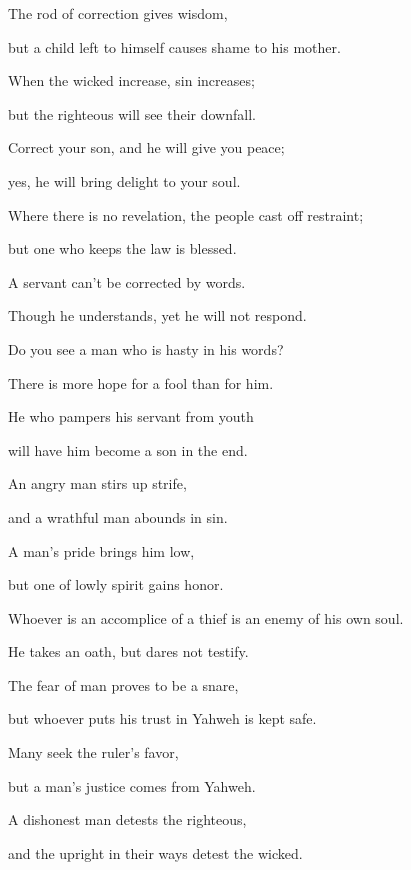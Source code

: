{\par }{\Q {}The rod of correction gives wisdom,
\par }{\QB but a child left to himself causes shame to his mother.
\par }{\Q {}When the wicked increase, sin increases;
\par }{\QB but the righteous will see their downfall.
\par }{\Q {}Correct your son, and he will give you peace;
\par }{\QB yes, he will bring delight to your soul.
\par }{\Q {}Where there is no revelation, the people cast off restraint;
\par }{\QB but one who keeps the law is blessed.
\par }{\Q {}A servant can’t be corrected by words.
\par }{\QB Though he understands, yet he will not respond.
\par }{\Q {}Do you see a man who is hasty in his words?
\par }{\QB There is more hope for a fool than for him.
\par }{\Q {}He who pampers his servant from youth
\par }{\QB will have him become a son in the end.
\par }{\Q {}An angry man stirs up strife,
\par }{\QB and a wrathful man abounds in sin.
\par }{\Q {}A man’s pride brings him low,
\par }{\QB but one of lowly spirit gains honor.
\par }{\Q {}Whoever is an accomplice of a thief is an enemy of his own soul.
\par }{\QB He takes an oath, but dares not testify.
\par }{\Q {}The fear of man proves to be a snare,
\par }{\QB but whoever puts his trust in Yahweh is kept safe.
\par }{\Q {}Many seek the ruler’s favor,
\par }{\QB but a man’s justice comes from Yahweh.
\par }{\Q {}A dishonest man detests the righteous,
\par }{\QB and the upright in their ways detest the wicked.

}
